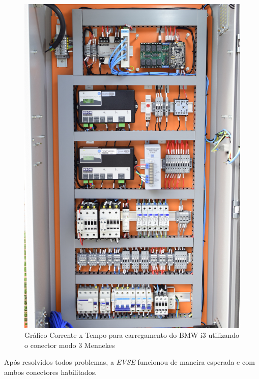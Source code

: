     \begin{figure}[H]
      \begin{center}
        \includegraphics[width=\textwidth,natwidth=1420,natheight=2130]{assets/images/setup-evse.jpg}
        \caption{Gráfico Corrente x Tempo para carregamento do BMW i3 utilizando o conector modo 3 Mennekes}
        \label{fig:evse-charge}
      \end{center}
    \end{figure}

    Após resolvidos todos problemas, a \textit{\ac{EVSE}} funcionou de maneira esperada e com ambos conectores habilitados.
